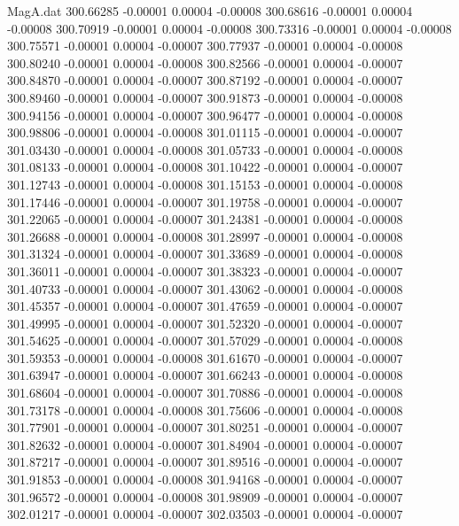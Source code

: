 \begin{filecontents}{MagA.dat}
 300.66285   -0.00001    0.00004   -0.00008
 300.68616   -0.00001    0.00004   -0.00008
 300.70919   -0.00001    0.00004   -0.00008
 300.73316   -0.00001    0.00004   -0.00008
 300.75571   -0.00001    0.00004   -0.00007
 300.77937   -0.00001    0.00004   -0.00008
 300.80240   -0.00001    0.00004   -0.00008
 300.82566   -0.00001    0.00004   -0.00007
 300.84870   -0.00001    0.00004   -0.00007
 300.87192   -0.00001    0.00004   -0.00007
 300.89460   -0.00001    0.00004   -0.00007
 300.91873   -0.00001    0.00004   -0.00008
 300.94156   -0.00001    0.00004   -0.00007
 300.96477   -0.00001    0.00004   -0.00008
 300.98806   -0.00001    0.00004   -0.00008
 301.01115   -0.00001    0.00004   -0.00007
 301.03430   -0.00001    0.00004   -0.00008
 301.05733   -0.00001    0.00004   -0.00008
 301.08133   -0.00001    0.00004   -0.00008
 301.10422   -0.00001    0.00004   -0.00007
 301.12743   -0.00001    0.00004   -0.00008
 301.15153   -0.00001    0.00004   -0.00008
 301.17446   -0.00001    0.00004   -0.00007
 301.19758   -0.00001    0.00004   -0.00007
 301.22065   -0.00001    0.00004   -0.00007
 301.24381   -0.00001    0.00004   -0.00008
 301.26688   -0.00001    0.00004   -0.00008
 301.28997   -0.00001    0.00004   -0.00008
 301.31324   -0.00001    0.00004   -0.00007
 301.33689   -0.00001    0.00004   -0.00008
 301.36011   -0.00001    0.00004   -0.00007
 301.38323   -0.00001    0.00004   -0.00007
 301.40733   -0.00001    0.00004   -0.00007
 301.43062   -0.00001    0.00004   -0.00008
 301.45357   -0.00001    0.00004   -0.00007
 301.47659   -0.00001    0.00004   -0.00007
 301.49995   -0.00001    0.00004   -0.00007
 301.52320   -0.00001    0.00004   -0.00007
 301.54625   -0.00001    0.00004   -0.00007
 301.57029   -0.00001    0.00004   -0.00008
 301.59353   -0.00001    0.00004   -0.00008
 301.61670   -0.00001    0.00004   -0.00007
 301.63947   -0.00001    0.00004   -0.00007
 301.66243   -0.00001    0.00004   -0.00008
 301.68604   -0.00001    0.00004   -0.00007
 301.70886   -0.00001    0.00004   -0.00008
 301.73178   -0.00001    0.00004   -0.00008
 301.75606   -0.00001    0.00004   -0.00008
 301.77901   -0.00001    0.00004   -0.00007
 301.80251   -0.00001    0.00004   -0.00007
 301.82632   -0.00001    0.00004   -0.00007
 301.84904   -0.00001    0.00004   -0.00007
 301.87217   -0.00001    0.00004   -0.00007
 301.89516   -0.00001    0.00004   -0.00007
 301.91853   -0.00001    0.00004   -0.00008
 301.94168   -0.00001    0.00004   -0.00007
 301.96572   -0.00001    0.00004   -0.00008
 301.98909   -0.00001    0.00004   -0.00007
 302.01217   -0.00001    0.00004   -0.00007
 302.03503   -0.00001    0.00004   -0.00007

\end{filecontents}
